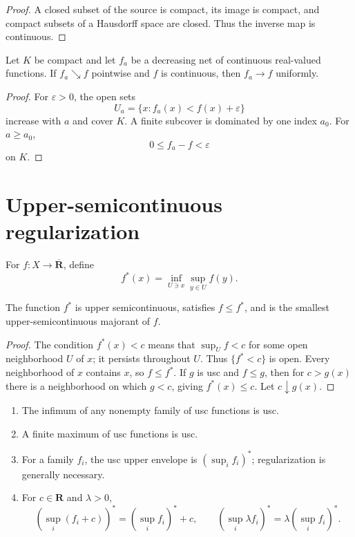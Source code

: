 \begin{proof}
A closed subset of the source is compact, its image is compact, and compact
subsets of a Hausdorff space are closed.
Thus the inverse map is continuous.
\end{proof}

\begin{theorem}\label{thm:appE-dini}
Let \(K\) be compact and let \(f_a\) be a decreasing net of continuous
real-valued functions.
If \(f_a\searrow f\) pointwise and \(f\) is continuous, then
\(f_a\to f\) uniformly.
\end{theorem}

\begin{proof}
For \(\varepsilon>0\), the open sets
\[
                  U_a=\{x:f_a(x)<f(x)+\varepsilon\}
\]
increase with \(a\) and cover \(K\).
A finite subcover is dominated by one index \(a_0\).
For \(a\geq a_0\),
\[
                         0\leq f_a-f<\varepsilon
\]
on \(K\).
\end{proof}

\section{Upper-semicontinuous regularization}
\label{sec:appE-usc}

For \(f:X\to\overline{\mathbf R}\), define
\[
 f^*(x)=\inf_{U\ni x}\sup_{y\in U}f(y).
\tag{E.4}\label{eq:appE-usc-regularization}
\]

\begin{proposition}\label{prop:appE-usc-majorant}
The function \(f^*\) is upper semicontinuous, satisfies \(f\leq f^*\), and
is the smallest upper-semicontinuous majorant of \(f\).
\end{proposition}

\begin{proof}
The condition \(f^*(x)<c\) means that
\(\sup_Uf<c\) for some open neighborhood \(U\) of \(x\); it persists throughout
\(U\).
Thus \(\{f^*<c\}\) is open.
Every neighborhood of \(x\) contains \(x\), so \(f\leq f^*\).
If \(g\) is usc and \(f\leq g\), then for \(c>g(x)\) there is a neighborhood
on which \(g<c\), giving \(f^*(x)\leq c\).
Let \(c\downarrow g(x)\).
\end{proof}

\begin{lemma}\label{lem:appE-usc-calculus}
\begin{enumerate}
\item The infimum of any nonempty family of usc functions is usc.
\item A finite maximum of usc functions is usc.
\item For a family \(f_i\), the usc upper envelope is
      \((\sup_i f_i)^*\); regularization is generally necessary.
\item For \(c\in\mathbf R\) and \(\lambda>0\),
\[
 (\sup_i(f_i+c))^*=(\sup_i f_i)^*+c,\qquad
 (\sup_i\lambda f_i)^*=\lambda(\sup_i f_i)^*.
\tag{E.5}\label{eq:appE-usc-affine}
\]
\end{enumerate}
\par
\end{lemma}

